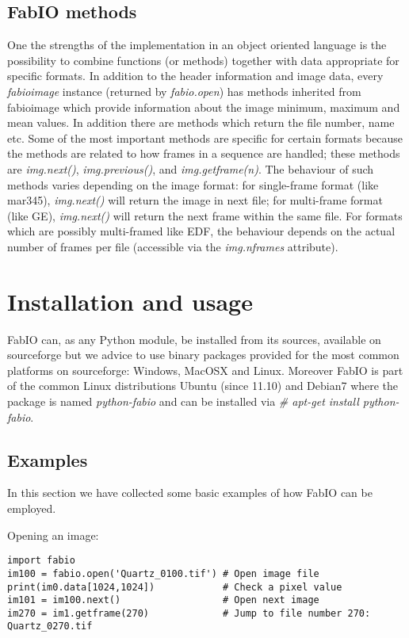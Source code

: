 \documentclass[preprint]{iucr}
\begin{document}
\subsection{FabIO methods}

One the strengths of the implementation in an object oriented language
is the possibility to combine functions (or methods) together with data
appropriate for specific formats.
In addition to the header information and image data, every {\em fabioimage}
instance (returned by {\em fabio.open}) has methods inherited from fabioimage 
which provide information about the image minimum, maximum and mean values.
In addition there are methods which return the file number, name etc. 
Some of the most important methods are specific for certain formats because 
the methods are related to how frames in a sequence are handled; these methods
are {\em img.next()}, {\em img.previous()}, and {\em img.getframe(n)}.
The behaviour of such methods varies depending on the
image format: for single-frame format (like mar345), {\em img.next()} will
return the image in next file; for multi-frame format (like GE), {\em
img.next()} will return the next frame within the same file. For formats which are possibly 
multi-framed like EDF, the behaviour depends on the actual number of frames per
file (accessible via the {\em img.nframes} attribute).


\section{Installation and usage}

FabIO can, as any Python module, be installed from its sources, available on 
sourceforge \cite{fabio} but we advice to use binary packages provided for the
most common platforms on sourceforge: Windows, MacOSX and Linux.
Moreover FabIO is part of the common Linux distributions Ubuntu (since 11.10)
and Debian7 where the package is named {\em python-fabio} and can be installed
via {\em \# apt-get install python-fabio}. 

\subsection{Examples}

In this section we have collected some basic examples of how FabIO can be employed. 

Opening an image:\\
\begin{verbatim}
import fabio     
im100 = fabio.open('Quartz_0100.tif') # Open image file
print(im0.data[1024,1024])            # Check a pixel value
im101 = im100.next()                  # Open next image
im270 = im1.getframe(270)             # Jump to file number 270: Quartz_0270.tif
\end{verbatim}
\end{document}
